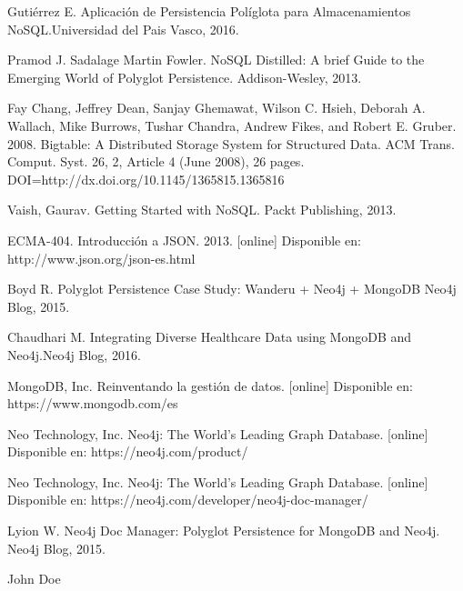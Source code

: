 \documentclass[conference]{IEEEtran}
\begin{document}
%
%
%
\begin{thebibliography}{1}

Guti\'errez E. Aplicaci\'on de Persistencia Pol\'iglota para Almacenamientos NoSQL.Universidad del Pais Vasco, 2016.

Pramod J. Sadalage Martin Fowler. NoSQL Distilled: A brief Guide to the Emerging
World of Polyglot Persistence. Addison-Wesley, 2013.

Fay Chang, Jeffrey Dean, Sanjay Ghemawat, Wilson C. Hsieh, Deborah A. Wallach, Mike Burrows, Tushar Chandra, Andrew Fikes, and Robert E. Gruber. 2008. Bigtable: A Distributed Storage System for Structured Data. ACM Trans. Comput. Syst. 26, 2, Article 4 (June 2008), 26 pages. DOI=http://dx.doi.org/10.1145/1365815.1365816

Vaish, Gaurav. Getting Started with NoSQL. Packt Publishing, 2013.

ECMA-404. Introducción a JSON. 2013. [online]
Disponible en: http://www.json.org/json-es.html

Boyd R. Polyglot Persistence Case Study: Wanderu + Neo4j + MongoDB Neo4j Blog, 2015.

Chaudhari M. Integrating Diverse Healthcare Data using MongoDB and Neo4j.Neo4j Blog, 2016.

MongoDB, Inc. Reinventando la gestión de datos. [online]
Disponible en: https://www.mongodb.com/es

Neo Technology, Inc. Neo4j: The World’s Leading Graph Database. [online]
Disponible en: https://neo4j.com/product/

Neo Technology, Inc. Neo4j: The World’s Leading Graph Database. [online]
Disponible en: https://neo4j.com/developer/neo4j-doc-manager/

Lyion W. Neo4j Doc Manager: Polyglot Persistence for MongoDB and Neo4j. Neo4j Blog, 2015.

\end{thebibliography}

\begin{IEEEbiography}{John Doe}
\blindtext
\end{IEEEbiography}
\end{document}
